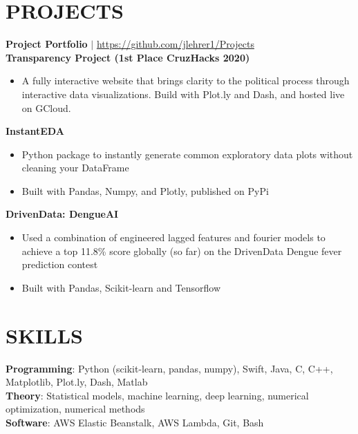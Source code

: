 \documentclass[margin]{res}
\begin{document}
\begin{resume}
\section{PROJECTS}
    \textbf{Project Portfolio} $\mid$ \textcolor{blue}{\href{https://github.com/jlehrer1/Projects}{https://github.com/jlehrer1/Projects}} \vspace {2mm} \\
    \textbf{Transparency Project (1st Place CruzHacks 2020)}
    \begin{itemize}
        \item A fully interactive website that brings clarity to the political process through interactive data visualizations. Build with Plot.ly and Dash, and hosted live on GCloud.
    \end{itemize}\vspace*{-8pt}
    \textbf{InstantEDA}
    \begin{itemize}
        \item Python package to instantly generate common exploratory data plots without cleaning your DataFrame
        \item Built with Pandas, Numpy, and Plotly, published on PyPi
    \end{itemize}\vspace*{-8pt}
    \textbf{DrivenData: DengueAI}
    \begin{itemize}
        \item Used a combination of engineered lagged features and fourier models to achieve a top 11.8\% score globally (so far) on the DrivenData Dengue fever prediction contest
        \item Built with Pandas, Scikit-learn and Tensorflow
    \end{itemize}\vspace*{-8pt}
\section{SKILLS}
    \textbf{Programming}: Python (scikit-learn, pandas, numpy), Swift, Java, C, C++,\\Matplotlib, Plot.ly, Dash, Matlab\\
    \textbf{Theory}: Statistical models, machine learning, deep learning, numerical optimization, numerical methods \\
    \textbf{Software}: AWS Elastic Beanstalk, AWS Lambda, Git, Bash

\end{resume}
\end{document}
